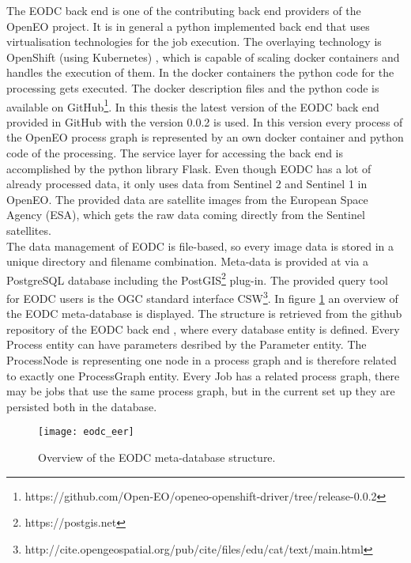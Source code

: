 \documentclass[draft,final]{vutinfth} %
\begin{document}
 The EODC back end is one of the contributing back end providers of the OpenEO project. It is in general a python implemented back end that uses virtualisation technologies for the job execution. The overlaying technology is OpenShift (using Kubernetes) \cite{openshift}, which is capable of scaling docker containers and handles the execution of them. In the docker containers the python code for the processing gets executed. The docker description files and the python code is available on GitHub\footnote{https://github.com/Open-EO/openeo-openshift-driver/tree/release-0.0.2}. In this thesis the latest version of the EODC back end provided in GitHub with the version 0.0.2 is used. In this version every process of the OpenEO process graph is represented by an own docker container and python code of the processing. The service layer for accessing the back end is accomplished by the python library Flask. Even though EODC has a lot of already processed data, it only uses data from Sentinel 2 and Sentinel 1 in OpenEO. The provided data are satellite images from the European Space Agency (ESA), which gets the raw data coming directly from the Sentinel satellites. \\
 The data management of EODC is file-based, so every image data is stored in a unique directory and filename combination. Meta-data is provided at via a PostgreSQL database including the PostGIS\footnote{https://postgis.net} plug-in. The provided query tool for EODC users is the OGC standard interface CSW\footnote{http://cite.opengeospatial.org/pub/cite/files/edu/cat/text/main.html}. In figure \ref{fig:eodceer} an overview of the EODC meta-database is displayed. The structure is retrieved from the github repository of the EODC back end \cite{eodc_github}, where every database entity is defined. Every Process entity can have parameters desribed by the Parameter entity. The ProcessNode is representing one node in a process graph and is therefore related to exactly one ProcessGraph entity. Every Job has a related process graph, there may be jobs that use the same process graph, but in the current set up they are persisted both in the database.

 \begin{figure}[h]
 	\centering
 	\texttt{[image: eodc\_eer]}
 	\caption{Overview of the EODC meta-database structure.}
 	\label{fig:eodceer} %
 \end{figure}
 
\end{document}
